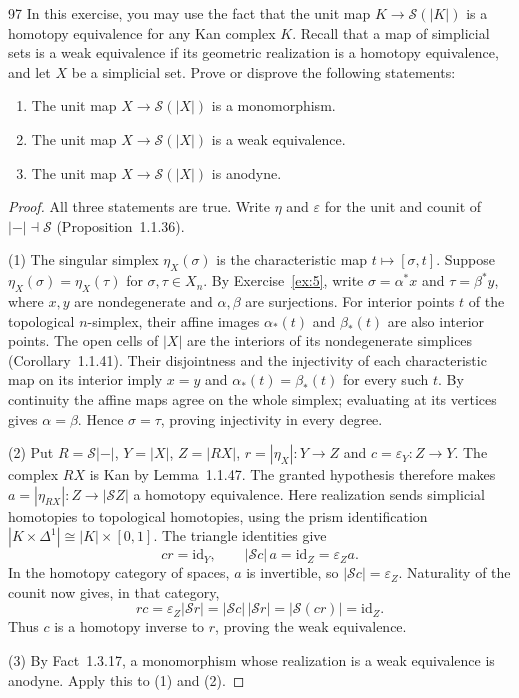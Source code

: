 \begin{exercise}{97}
In this exercise, you may use the fact that the unit map
$K\to\mathcal S(|K|)$ is a homotopy equivalence for any Kan complex $K$.
Recall that a map of simplicial sets is a weak equivalence if its geometric
realization is a homotopy equivalence, and let $X$ be a simplicial set.
Prove or disprove the following statements:
\begin{enumerate}[label=(\arabic*)]
\item The unit map $X\to\mathcal S(|X|)$ is a monomorphism.
\item The unit map $X\to\mathcal S(|X|)$ is a weak equivalence.
\item The unit map $X\to\mathcal S(|X|)$ is anodyne.
\end{enumerate}

\begin{proof}
All three statements are true. Write $\eta$ and $\varepsilon$ for the unit
and counit of $|{-}|\dashv\mathcal S$ (Proposition~1.1.36).

(1) The singular simplex $\eta_X(\sigma)$ is the characteristic map
$t\mapsto[\sigma,t]$.
Suppose $\eta_X(\sigma)=\eta_X(\tau)$ for $\sigma,\tau\in X_n$.
By Exercise~\ref{ex:5}, write $\sigma=\alpha^*x$ and $\tau=\beta^*y$,
where $x,y$ are nondegenerate and $\alpha,\beta$ are surjections.
For interior points $t$ of the topological $n$-simplex, their affine images
$\alpha_*(t)$ and $\beta_*(t)$ are also interior points.
The open cells of $|X|$ are the interiors of its nondegenerate simplices
(Corollary~1.1.41).
Their disjointness and the injectivity of each characteristic map on its
interior imply $x=y$ and $\alpha_*(t)=\beta_*(t)$ for every such $t$.
By continuity the affine maps agree on the whole simplex; evaluating at
its vertices gives $\alpha=\beta$.
Hence $\sigma=\tau$, proving injectivity in every degree.

(2) Put $R=\mathcal S|{-}|$, $Y=|X|$, $Z=|RX|$,
$r=|\eta_X|\colon Y\to Z$ and $c=\varepsilon_Y\colon Z\to Y$.
The complex $RX$ is Kan by Lemma~1.1.47.
The granted hypothesis therefore makes
$a=|\eta_{RX}|\colon Z\to|\mathcal S Z|$ a homotopy equivalence.
Here realization sends simplicial homotopies to topological homotopies,
using the prism identification
$|K\times\Delta^1|\cong|K|\times[0,1]$.
The triangle identities give
\[
 cr=\mathrm{id}_Y,\qquad
 |\mathcal S c|\,a=\mathrm{id}_Z=\varepsilon_Za.
\]
In the homotopy category of spaces, $a$ is invertible, so
$|\mathcal S c|=\varepsilon_Z$.
Naturality of the counit now gives, in that category,
\[
 rc=\varepsilon_Z|\mathcal S r|
   =|\mathcal S c|\,|\mathcal S r|
   =|\mathcal S(cr)|=\mathrm{id}_Z.
\]
Thus $c$ is a homotopy inverse to $r$, proving the weak equivalence.

(3) By Fact~1.3.17, a monomorphism whose realization is a weak equivalence
is anodyne. Apply this to (1) and (2).
\end{proof}
\end{exercise}
